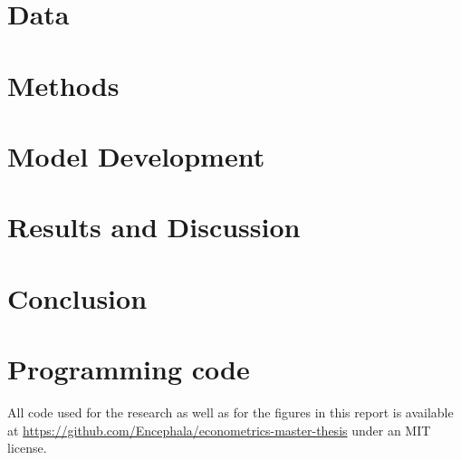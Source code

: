 \documentclass[a4paper,11pt]{report}
\begin{document}
\chapter{Data}
\label{chap:data}


\chapter{Methods}
\label{chap:methods}


\chapter{Model Development}
\label{chap:modelling}


\chapter{Results and Discussion}
\label{chap:results_discussion}


\chapter{Conclusion}
\label{chap:conclusion}






\appendix
\chapter{Programming code}
All code used for the research as well as for the figures in this report is available at \url{https://github.com/Encephala/econometrics-master-thesis} under an MIT license.
\end{document}
